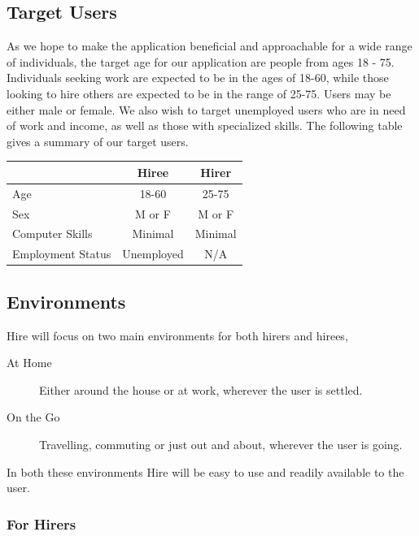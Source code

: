 \documentclass[11pt]{article}
\begin{document}
\subsection{Target Users}


As we hope to make the application beneficial and approachable for a wide range of individuals, the target age for our application are people from ages 18 - 75. Individuals seeking work are expected to be in the ages of 18-60, while those looking to hire others are expected to be in the range of 25-75. Users may be either male or female. We also wish to target unemployed users who are in need of work and income, as well as those with  specialized skills. The following table gives a summary of our target users.

\begin{center}
  \begin{tabular}{| l | c | c |}
  \hline
    & Hiree & Hirer \\ \hline
    Age & 18-60 & 25-75 \\ \hline
    Sex & M or F & M or F \\ \hline
    Computer Skills & Minimal & Minimal \\ \hline
    Employment Status & Unemployed & N/A\\
    \hline
  \end{tabular}
\end{center}

\subsection{Environments}

Hire will focus on two main environments for both hirers and hirees,

\begin{description}
    \item[At Home] Either around the house or at work, wherever the user is settled.
    \item[On the Go] Travelling, commuting or just out and about, wherever the user is going.
\end{description}

In both these environments Hire will be easy to use and readily available to the user.

\subsubsection{For Hirers}
\end{document}
